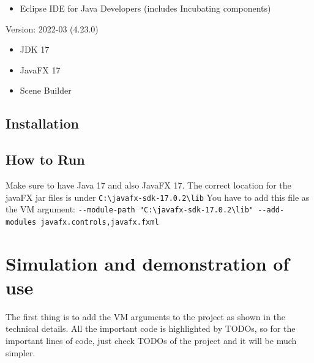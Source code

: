 \documentclass[
]{report}
\providecommand{\tightlist}{%
  \setlength{\itemsep}{0pt}\setlength{\parskip}{0pt}}
\begin{document}
\begin{itemize}
\tightlist
\item
  Eclipse IDE for Java Developers (includes Incubating components)
\end{itemize}

Version: 2022-03 (4.23.0)

\begin{itemize}
\tightlist
\item
  JDK 17
\item
  JavaFX 17
\item
  Scene Builder
\end{itemize}

\hypertarget{installation}{%
\section{Installation}\label{installation}}

\hypertarget{how-to-run}{%
\section{How to Run}\label{how-to-run}}

Make sure to have Java 17 and also JavaFX 17.
The correct location for the javaFX jar files is under \texttt{C:\textbackslash{}javafx-sdk-17.0.2\textbackslash{}lib}
You have to add this file as the VM argument: \texttt{-\/-module-path\ "C:\textbackslash{}javafx-sdk-17.0.2\textbackslash{}lib"\ -\/-add-modules\ javafx.controls,javafx.fxml}

\hypertarget{simulation-and-demonstration-of-use}{%
\chapter{Simulation and demonstration of use}\label{simulation-and-demonstration-of-use}}

The first thing is to add the VM arguments to the project as shown in the technical details. All the important code is highlighted by TODOs, so for the important lines of code, just check TODOs of the project and it will be much simpler.

  
\end{document}
